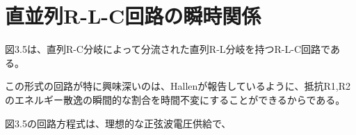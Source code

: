 \documentclass[fleqn,11pt,a4paper]{jsarticle}
\begin{document}
%
%
\section{直並列R-L-C回路の瞬時関係}


図3.5は、直列R-C分岐によって分流された直列R-L分岐を持つR-L-C回路である。

この形式の回路が特に興味深いのは、Hallenが報告しているように、抵抗R1,R2のエネルギー散逸の瞬間的な割合を時間不変にすることができるからである。

図3.5の回路方程式は、理想的な正弦波電圧供給で、

\newpage

\newpage


%
%
\end{document}
